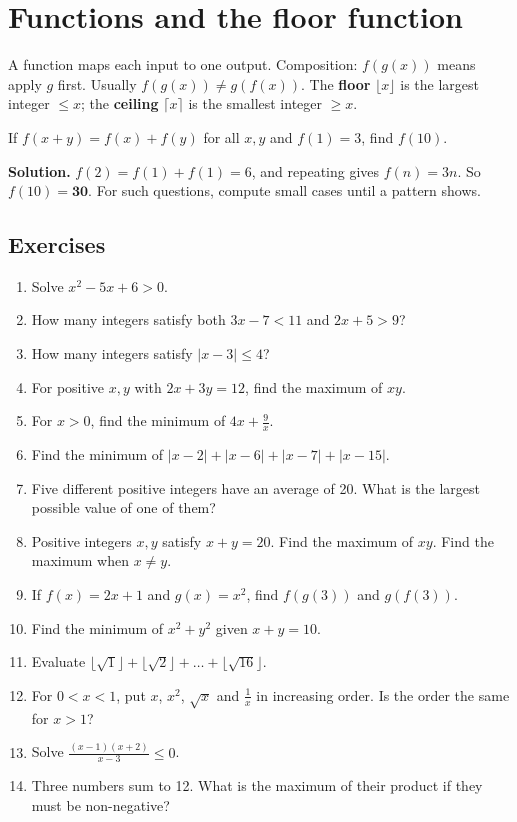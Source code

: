\documentclass[11pt,a4paper,openany]{report}
\newenvironment{exercises}{\subsection*{Exercises \thechapter}\begin{enumerate}[label=\textbf{\thechapter.\arabic*},leftmargin=3.2em]}{\end{enumerate}}
\begin{document}
\section{Functions and the floor function}
A function maps each input to one output. Composition: $f(g(x))$ means apply $g$ first. Usually $f(g(x))\ne g(f(x))$. The \textbf{floor} $\lfloor x\rfloor$ is the largest integer $\le x$; the \textbf{ceiling} $\lceil x\rceil$ is the smallest integer $\ge x$.

\begin{example}
If $f(x+y)=f(x)+f(y)$ for all $x,y$ and $f(1)=3$, find $f(10)$.

\textbf{Solution.} $f(2)=f(1)+f(1)=6$, and repeating gives $f(n)=3n$. So $f(10)=\mathbf{30}$. For such questions, compute small cases until a pattern shows.
\end{example}

\begin{exercises}
\item Solve $x^2-5x+6>0$.
\item How many integers satisfy both $3x-7<11$ and $2x+5>9$?
\item How many integers satisfy $|x-3|\le4$?
\item For positive $x,y$ with $2x+3y=12$, find the maximum of $xy$.
\item For $x>0$, find the minimum of $4x+\frac9x$.
\item Find the minimum of $|x-2|+|x-6|+|x-7|+|x-15|$.
\item Five different positive integers have an average of 20. What is the largest possible value of one of them?
\item Positive integers $x,y$ satisfy $x+y=20$. Find the maximum of $xy$. Find the maximum when $x\ne y$.
\item If $f(x)=2x+1$ and $g(x)=x^2$, find $f(g(3))$ and $g(f(3))$.
\item Find the minimum of $x^2+y^2$ given $x+y=10$.
\item Evaluate $\lfloor\sqrt1\rfloor+\lfloor\sqrt2\rfloor+\dots+\lfloor\sqrt{16}\rfloor$.
\item For $0<x<1$, put $x$, $x^2$, $\sqrt x$ and $\frac1x$ in increasing order. Is the order the same for $x>1$?
\item Solve $\frac{(x-1)(x+2)}{x-3}\le0$.
\item Three numbers sum to 12. What is the maximum of their product if they must be non-negative?
\end{exercises}
\end{document}

